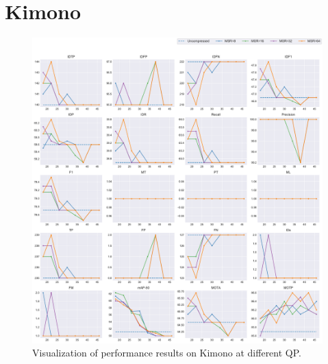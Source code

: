 
\section{Kimono}
\label{sec:appendix/Kimono_all}


\begin{figure}[!htbp]
\centering
\includegraphics[width=1.0\linewidth]{img/appendix/Kimono_all_multiplots_qp.pdf}
\caption[Visualization of performance results on Kimono at different QP]
{Visualization of performance results on Kimono at different QP.}
\label{fig:Kimono_all_qp}
\end{figure}

